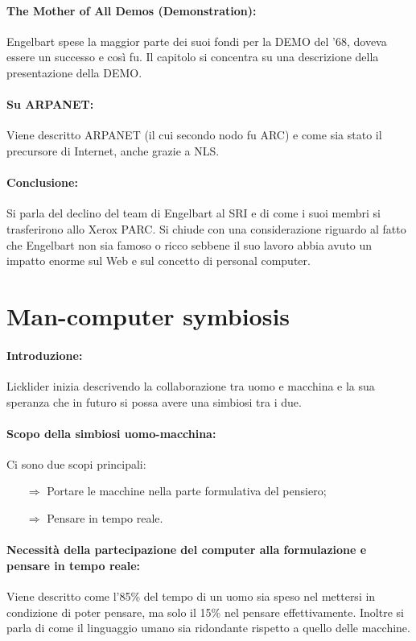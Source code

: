 \paragraph{The Mother of All Demos (Demonstration):} Engelbart spese la maggior parte dei suoi fondi per la DEMO 
del '68, doveva essere un successo e così fu. Il capitolo si concentra su una descrizione della presentazione della DEMO.

\paragraph{Su ARPANET:} Viene descritto ARPANET (il cui secondo nodo fu ARC) e come sia stato il precursore di Internet, anche grazie a NLS.

\paragraph{Conclusione:} Si parla del declino del team di Engelbart al SRI e di come i suoi membri 
si trasferirono allo Xerox PARC. Si chiude con una considerazione riguardo al fatto che Engelbart non sia
famoso o ricco sebbene il suo lavoro abbia avuto un impatto enorme sul Web e sul concetto di personal computer.

\section{Man-computer symbiosis}

\paragraph{Introduzione:} Licklider inizia descrivendo la collaborazione tra uomo e macchina e la sua speranza che 
in futuro si possa avere una simbiosi tra i due. 

\paragraph{Scopo della simbiosi uomo-macchina:} Ci sono due scopi principali:

\begin{itemize}
    \item [$\Rightarrow$] Portare le macchine nella parte formulativa del pensiero;
    \item [$\Rightarrow$] Pensare in tempo reale.
\end{itemize}

\paragraph{Necessità della partecipazione del computer alla formulazione e 
pensare in tempo reale:} Viene descritto come l'85\% del tempo di un uomo sia speso nel 
mettersi in condizione di poter pensare, ma solo il 15\% nel pensare effettivamente.
Inoltre si parla di come il linguaggio umano sia ridondante rispetto a quello delle macchine.

